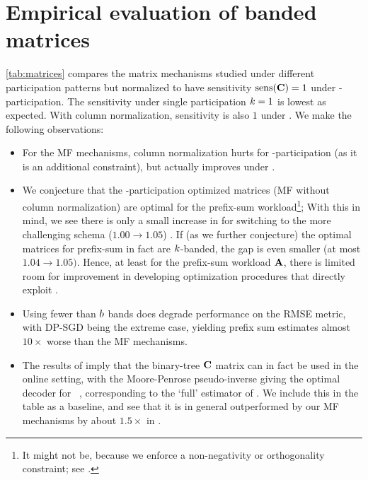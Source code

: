 \documentclass{article}
\begin{document}
\section{Empirical evaluation of banded matrices}\label{sec:matrixtable}

\cref{tab:matrices} compares the matrix mechanisms studied under different participation patterns but normalized to have sensitivity $\operatorname{sens}(\mathbf{C})=1$ under -participation. The sensitivity under single participation $k=1$ is lowest as expected. With column normalization, sensitivity is also $1$ under . We make the following observations:
\begin{itemize}
    \item For the MF mechanisms, column normalization hurts \rmse for \multiepoch-participation (as it is an additional constraint), but actually improves \rmse under \bparticipation.  
    
    \item We conjecture that the \multiepoch-participation optimized matrices (MF without column normalization) are optimal for the prefix-sum workload\footnote{It might not be, because we enforce a non-negativity or orthogonality constraint; see \citet[Appendix I.3]{choquette2022multi}.}; With this in mind, we see there is only a small increase in \rmse for switching to the more challenging \bparticipation schema ($1.00 \rightarrow 1.05$) . If (as we further conjecture) the optimal matrices for prefix-sum in fact are $k$-banded, the gap is even smaller (at most $1.04 \rightarrow 1.05)$. Hence, at least for the prefix-sum workload $\mathbf{A}$,  there is limited room for improvement in developing optimization procedures that directly exploit \bparticipation.
    
    \item Using fewer than $b$ bands does degrade performance on the RMSE metric, with DP-SGD being the extreme case, yielding prefix sum estimates almost $10\times$ worse than the MF mechanisms.
    
    \item The results of \citet{denisov22matfact} imply that the binary-tree $\mathbf{C}$ matrix can in fact be used in the online setting, with the Moore-Penrose pseudo-inverse giving the optimal decoder for \rmse~\cite{choquette2022multi}, corresponding to the `full' estimator of \citet{honaker2015efficient}. We include this in the table as a baseline, and see that it is in general outperformed by our MF mechanisms by about $1.5\times$ in \rmse.  
\end{itemize}
\end{document}
